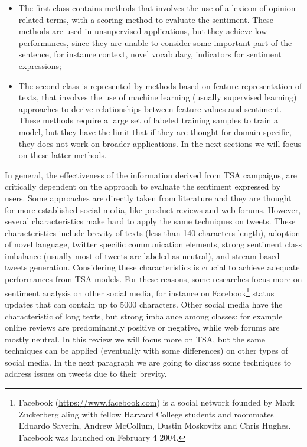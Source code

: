 \begin{itemize}
	\item The first class contains methods that involves the use of a lexicon of opinion-related terms, with a scoring method to evaluate the sentiment. These methods are used in unsupervised applications, but they achieve low performances, since they are unable to consider some important part of the sentence, for instance context, novel vocabulary, indicators for sentiment expressions;
	\item The second class is represented by methods based on feature representation of texts, that involves the use of machine learning (usually supervised learning) approaches to derive relationships between feature values and sentiment. These methods require a large set of labeled training samples to train a model, but they have the limit that if they are thought for domain specific, they does not work on broader applications. In the next sections we will focus on these latter methods.
\end{itemize}
In general, the effectiveness of the information derived from \ac{TSA} campaigns, are critically dependent on the approach to evaluate the sentiment expressed by users. Some approaches are directly taken from literature and they are thought for more established social media, like product reviews and web forums. However, several characteristics make hard to apply the same techniques on tweets. These characteristics include brevity of texts (less than 140 characters length), adoption of novel language, twitter specific communication elements, strong sentiment class imbalance (usually most of tweets are labeled as neutral), and stream based tweets generation. Considering these characteristics is crucial to achieve adequate performances from \ac{TSA} models. For these reasons, some researches focus more on sentiment analysis on other social media, for instance on Facebook\footnote{Facebook (\url{https://www.facebook.com}) is a social network founded by Mark Zuckerberg aling with fellow Harvard College students and roommates Eduardo Saverin, Andrew McCollum, Dustin Moskovitz and Chris Hughes. Facebook was launched on February 4 2004.} status updates that can contain up to 5000 characters. Other social media have the characteristic of long texts, but strong imbalance among classes: for example online reviews are predominantly positive or negative, while web forums are mostly neutral. In this review we will focus more on \ac{TSA}, but the same techniques can be applied (eventually with some differences) on other types of social media. In the next paragraph we are going to discuss some techniques to address issues on tweets due to their brevity.


